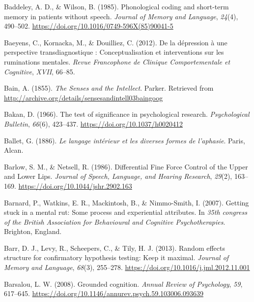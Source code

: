 \documentclass[a4paper,12pt,twoside,onecolumn,openright,final,oldfontcommands]{memoir}
\begin{document}
\leavevmode\hypertarget{ref-baddeley_phonological_1985}{}%
Baddeley, A. D., \& Wilson, B. (1985). Phonological coding and short-term memory in patients without speech. \emph{Journal of Memory and Language}, \emph{24}(4), 490--502. \url{https://doi.org/10.1016/0749-596X(85)90041-5}

\leavevmode\hypertarget{ref-Baeyens2012}{}%
Baeyens, C., Kornacka, M., \& Douilliez, C. (2012). De la dépression à une perspective transdiagnostique : Conceptualisation et interventions sur les ruminations mentales. \emph{Revue Francophone de Clinique Comportementale et Cognitive}, \emph{XVII}, 66--85.

\leavevmode\hypertarget{ref-bain_senses_1855}{}%
Bain, A. (1855). \emph{The Senses and the Intellect}. Parker. Retrieved from \url{http://archive.org/details/sensesandintell03baingoog}

\leavevmode\hypertarget{ref-bakan_test_1966}{}%
Bakan, D. (1966). The test of significance in psychological research. \emph{Psychological Bulletin}, \emph{66}(6), 423--437. \url{https://doi.org/10.1037/h0020412}

\leavevmode\hypertarget{ref-ballet_langage_1886}{}%
Ballet, G. (1886). \emph{Le langage intérieur et les diverses formes de l'aphasie}. Paris, Alcan.

\leavevmode\hypertarget{ref-barlow_differential_1986}{}%
Barlow, S. M., \& Netsell, R. (1986). Differential Fine Force Control of the Upper and Lower Lips. \emph{Journal of Speech, Language, and Hearing Research}, \emph{29}(2), 163--169. \url{https://doi.org/10.1044/jshr.2902.163}

\leavevmode\hypertarget{ref-barnard_getting_2007}{}%
Barnard, P., Watkins, E. R., Mackintosh, B., \& Nimmo-Smith, I. (2007). Getting stuck in a mental rut: Some process and experiential attributes. In \emph{35th congress of the British Association for Behavioural and Cognitive Psychotherapies}. Brighton, England.

\leavevmode\hypertarget{ref-barr_random_2013-1}{}%
Barr, D. J., Levy, R., Scheepers, C., \& Tily, H. J. (2013). Random effects structure for confirmatory hypothesis testing: Keep it maximal. \emph{Journal of Memory and Language}, \emph{68}(3), 255--278. \url{https://doi.org/10.1016/j.jml.2012.11.001}

\leavevmode\hypertarget{ref-Barsalou2008}{}%
Barsalou, L. W. (2008). Grounded cognition. \emph{Annual Review of Psychology}, \emph{59}, 617--645. \url{https://doi.org/10.1146/annurev.psych.59.103006.093639}
\end{document}
